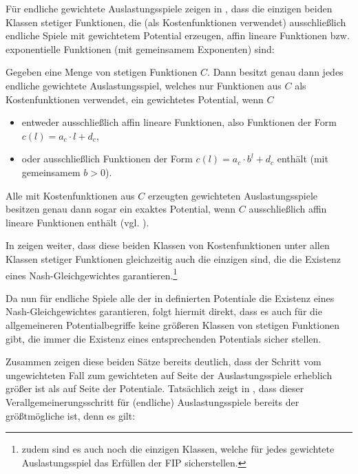 Für endliche gewichtete Auslastungsspiele zeigen \citeauthor{CharExGewPotinWCG} in \cite[Theorem 3.9]{CharExGewPotinWCG}, dass die einzigen beiden Klassen stetiger Funktionen, die (als Kostenfunktionen verwendet) ausschließlich endliche Spiele mit gewichtetem Potential erzeugen, affin lineare Funktionen bzw. exponentielle Funktionen (mit gemeinsamem Exponenten) sind:

\begin{satz}\label{satz:CharExGewPotinWCG}
	Gegeben eine Menge von stetigen Funktionen $C$. Dann besitzt genau dann jedes endliche gewichtete Auslastungsspiel, welches nur Funktionen aus $C$ als Kostenfunktionen verwendet, ein gewichtetes Potential, wenn $C$
	\begin{itemize}
		\item entweder ausschließlich affin lineare Funktionen, also Funktionen der Form $c(l) = a_c \cdot l + d_c$,
		\item oder ausschließlich Funktionen der Form $c(l) = a_c\cdot b^l + d_c$ enthält (mit gemeinsamem $b > 0$).
	\end{itemize}
	Alle mit Kostenfunktionen aus $C$ erzeugten gewichteten Auslastungsspiele besitzen genau dann sogar ein exaktes Potential, wenn $C$ ausschließlich affin lineare Funktionen enthält (vgl. \cite[Theorem 3.7]{CharExGewPotinWCG}).
\end{satz}

In \cite[Theorem 5.1]{CharExNGinWCG} zeigen \citeauthor{CharExNGinWCG} weiter, dass diese beiden Klassen von Kostenfunktionen unter allen Klassen stetiger Funktionen gleichzeitig auch die einzigen sind, die die Existenz eines Nash-Gleichgewichtes garantieren.\footnote{zudem sind es auch noch die einzigen Klassen, welche für jedes gewichtete Auslastungsspiel das Erfüllen der FIP sicherstellen.}

Da nun für endliche Spiele alle der in  definierten Potentiale die Existenz eines Nash-Gleichgewichtes garantieren, folgt hiermit direkt, dass es auch für die allgemeineren Potentialbegriffe keine größeren Klassen von stetigen Funktionen gibt, die immer die Existenz eines entsprechenden Potentials sicher stellen.

Zusammen zeigen diese beiden Sätze bereits deutlich, dass der Schritt vom ungewichteten Fall zum gewichteten auf Seite der Auslastungsspiele erheblich größer ist als auf Seite der Potentiale. Tatsächlich zeigt \citeauthor{ReprOfFiniteGamesAsNCG} in \cite[Theorem 1]{ReprOfFiniteGamesAsNCG}, dass dieser Verallgemeinerungsschritt für (endliche) Auslastungsspiele bereits der größtmögliche ist, denn es gilt:

